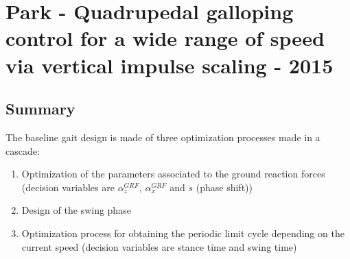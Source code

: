 \section{Park - Quadrupedal galloping control for a wide range of speed via vertical impulse scaling - 2015}

\subsection*{Summary}
The baseline gait design is made of three optimization processes made in a cascade:
\begin{enumerate}
\item Optimization of the parameters associated to the ground reaction forces (decision variables are $\alpha^{GRF}_z$, $\alpha^{GRF}_x$ and $s$ (phase shift))
\item Design of the swing phase
\item Optimization process for obtaining the periodic limit cycle depending on the current speed (decision variables are stance time and swing time)
\end{enumerate}